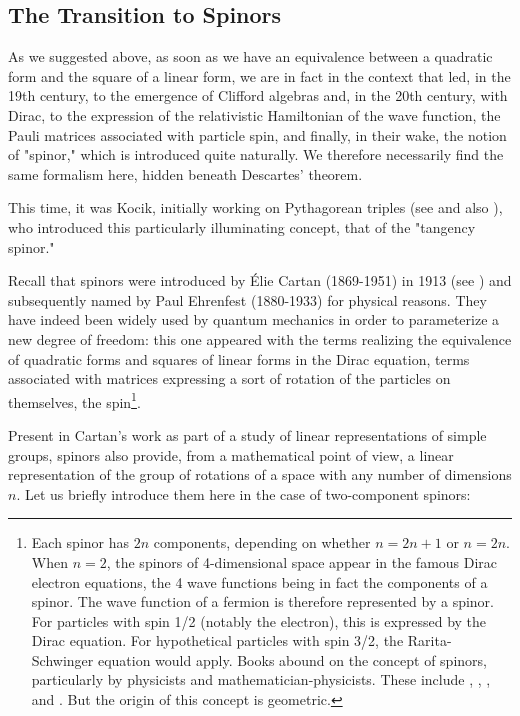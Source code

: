 \documentclass[12pt]{article}
\theoremstyle{définition}
\theoremstyle{remark}
\theoremstyle{plain}
\theoremstyle{plain}
\begin{document}
\subsection{The Transition to Spinors}

As we suggested above, as soon as we have an equivalence between a quadratic form and the square of a linear form, we are in fact in the context that led, in the 19th century, to the emergence of Clifford algebras and, in the 20th century, with Dirac, to the expression of the relativistic Hamiltonian of the wave function, the Pauli matrices associated with particle spin, and finally, in their wake, the notion of "spinor," which is introduced quite naturally. We therefore necessarily find the same formalism here, hidden beneath Descartes' theorem.

This time, it was Kocik, initially working on Pythagorean triples (see \cite{Koc6} and also \cite{Par}), who introduced this particularly illuminating concept, that of the "tangency spinor."

Recall that spinors were introduced by Élie Cartan (1869-1951) in 1913 (see \cite{Car1}) and subsequently named by Paul Ehrenfest (1880-1933) for physical reasons. They have indeed been widely used by quantum mechanics in order to parameterize a new degree of freedom: this one appeared with the terms realizing the equivalence of quadratic forms and squares of linear forms in the Dirac equation, terms associated with matrices expressing a sort of rotation of the particles on themselves, the spin\footnote{Each spinor has $2n$ components, depending on whether $n = 2n + 1$ or $n = 2n$. When $n = 2$, the spinors of 4-dimensional space appear in the famous Dirac electron equations, the 4 wave functions being in fact the components of a spinor. The wave function of a fermion is therefore represented by a spinor. For particles with spin 1/2 (notably the electron), this is expressed by the Dirac equation. For hypothetical particles with spin 3/2, the Rarita-Schwinger equation would apply. Books abound on the concept of spinors, particularly by physicists and mathematician-physicists. These include \cite{Car2}, \cite{Str}, \cite{Pen}, and \cite{Hla}. But the origin of this concept is geometric.}.

Present in Cartan's work as part of a study of linear representations of simple groups, spinors also provide, from a mathematical point of view, a linear representation of the group of rotations of a space with any number of dimensions $n$. Let us briefly introduce them here in the case of two-component spinors:
\end{document}
